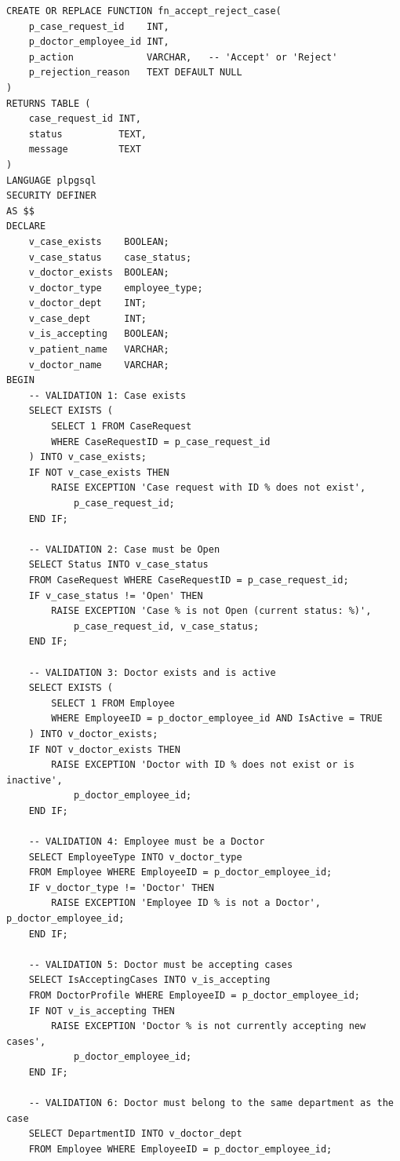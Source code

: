 \documentclass{article}
\begin{document}
\begin{lstlisting}
CREATE OR REPLACE FUNCTION fn_accept_reject_case(
    p_case_request_id    INT,
    p_doctor_employee_id INT,
    p_action             VARCHAR,   -- 'Accept' or 'Reject'
    p_rejection_reason   TEXT DEFAULT NULL
)
RETURNS TABLE (
    case_request_id INT,
    status          TEXT,
    message         TEXT
)
LANGUAGE plpgsql
SECURITY DEFINER
AS $$
DECLARE
    v_case_exists    BOOLEAN;
    v_case_status    case_status;
    v_doctor_exists  BOOLEAN;
    v_doctor_type    employee_type;
    v_doctor_dept    INT;
    v_case_dept      INT;
    v_is_accepting   BOOLEAN;
    v_patient_name   VARCHAR;
    v_doctor_name    VARCHAR;
BEGIN
    -- VALIDATION 1: Case exists
    SELECT EXISTS (
        SELECT 1 FROM CaseRequest
        WHERE CaseRequestID = p_case_request_id
    ) INTO v_case_exists;
    IF NOT v_case_exists THEN
        RAISE EXCEPTION 'Case request with ID % does not exist',
            p_case_request_id;
    END IF;

    -- VALIDATION 2: Case must be Open
    SELECT Status INTO v_case_status
    FROM CaseRequest WHERE CaseRequestID = p_case_request_id;
    IF v_case_status != 'Open' THEN
        RAISE EXCEPTION 'Case % is not Open (current status: %)',
            p_case_request_id, v_case_status;
    END IF;

    -- VALIDATION 3: Doctor exists and is active
    SELECT EXISTS (
        SELECT 1 FROM Employee
        WHERE EmployeeID = p_doctor_employee_id AND IsActive = TRUE
    ) INTO v_doctor_exists;
    IF NOT v_doctor_exists THEN
        RAISE EXCEPTION 'Doctor with ID % does not exist or is inactive',
            p_doctor_employee_id;
    END IF;

    -- VALIDATION 4: Employee must be a Doctor
    SELECT EmployeeType INTO v_doctor_type
    FROM Employee WHERE EmployeeID = p_doctor_employee_id;
    IF v_doctor_type != 'Doctor' THEN
        RAISE EXCEPTION 'Employee ID % is not a Doctor', p_doctor_employee_id;
    END IF;

    -- VALIDATION 5: Doctor must be accepting cases
    SELECT IsAcceptingCases INTO v_is_accepting
    FROM DoctorProfile WHERE EmployeeID = p_doctor_employee_id;
    IF NOT v_is_accepting THEN
        RAISE EXCEPTION 'Doctor % is not currently accepting new cases',
            p_doctor_employee_id;
    END IF;

    -- VALIDATION 6: Doctor must belong to the same department as the case
    SELECT DepartmentID INTO v_doctor_dept
    FROM Employee WHERE EmployeeID = p_doctor_employee_id;


\end{lstlisting}
\end{document}
